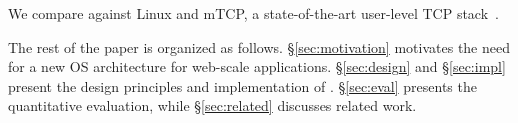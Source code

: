 
We compare \ix against Linux and mTCP, a state-of-the-art user-level
TCP stack~\cite{jeong2014mtcp}. 









 The rest of the paper is 
organized as follows. \S \ref{sec:motivation} motivates the need
for a new OS architecture for web-scale applications. \S\ref{sec:design} and \S\ref{sec:impl} present the design principles and
implementation of \ix. \S\ref{sec:eval} presents the
quantitative evaluation, while \S\ref{sec:related} discusses
related work. 





